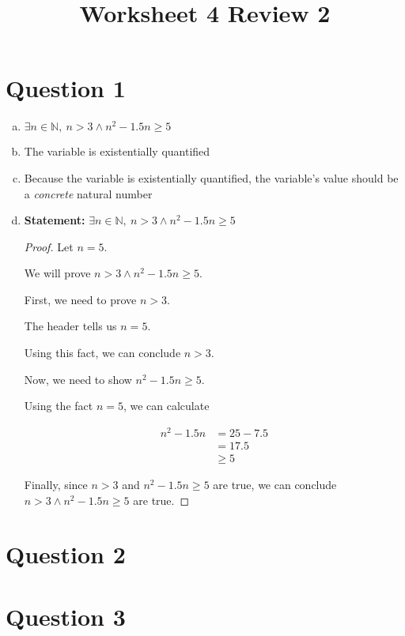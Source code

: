 \documentclass[12pt]{article}
\begin{document}
\title{Worksheet 4 Review 2}
\maketitle

\section*{Question 1}
\begin{enumerate}[a.]
    \item $\exists n \in \mathbb{N},\:n > 3 \land n^2 -1.5n \geq 5$
    \item The variable is existentially quantified
    \item Because the variable is existentially quantified, the variable's value
    should be a \textit{concrete} natural number
    \item

    \textbf{Statement:} $\exists n \in \mathbb{N},\:n > 3 \land n^2 -1.5n \geq 5$

    \bigskip

    \begin{proof}
    Let $n = 5$.

    \bigskip

    We will prove $n > 3 \land n^2 -1.5n \geq 5$.

    \bigskip

    First, we need to prove $n > 3$.

    \bigskip

    The header tells us $n=5$.

    \bigskip

    Using this fact, we can conclude $n > 3$.

    \bigskip

    Now, we need to show $n^2 - 1.5n \geq 5$.

    \bigskip

    Using the fact $n = 5$, we can calculate

    \begin{align}
        n^2 - 1.5n &= 25 - 7.5\\
        &= 17.5\\
        &\geq 5
    \end{align}

    \bigskip

    Finally, since $n > 3$ and $n^2 - 1.5n \geq 5$ are true, we can conclude
    $n > 3 \land n^2 - 1.5n \geq 5$ are true.
    \end{proof}
\end{enumerate}

\section*{Question 2}

\section*{Question 3}
\end{document}
